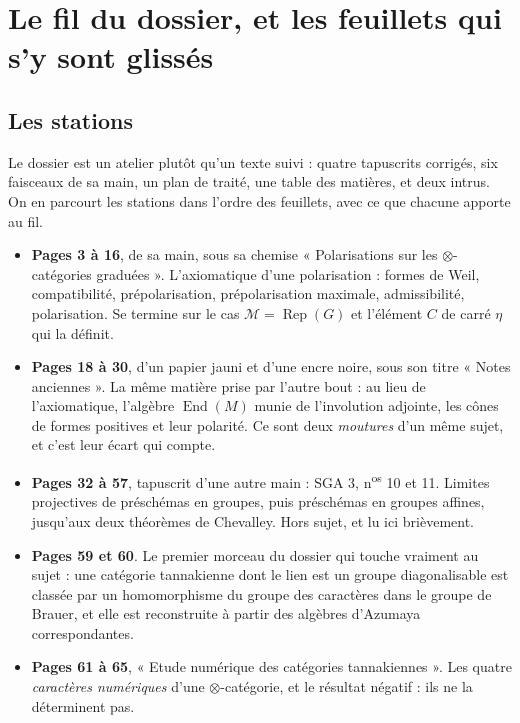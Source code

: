 \documentclass[11pt,a4paper]{article}
\begin{document}
\section*{Le fil du dossier, et les feuillets qui s'y sont glissés}

\subsection*{Les stations}

Le dossier est un atelier plutôt qu'un texte suivi : quatre tapuscrits
corrigés, six faisceaux de sa main, un plan de traité, une table des matières,
et deux intrus. On en parcourt les stations dans l'ordre des feuillets, avec
ce que chacune apporte au fil.

\begin{itemize}
\item \textbf{Pages 3 à 16}, de sa main, sous sa chemise « Polarisations sur
les $\otimes$-catégories graduées ». L'axiomatique d'une polarisation :
formes de Weil, compatibilité, prépolarisation, prépolarisation maximale,
admissibilité, polarisation. Se termine sur le cas $\mathcal{M} =
\operatorname{Rep}(G)$ et l'élément $C$ de carré $\eta$ qui la définit.

\item \textbf{Pages 18 à 30}, d'un papier jauni et d'une encre noire, sous son
titre « Notes anciennes ». La même matière prise par l'autre bout : au lieu de
l'axiomatique, l'algèbre $\operatorname{End}(M)$ munie de l'involution
adjointe, les cônes de formes positives et leur polarité. Ce sont deux
\emph{moutures} d'un même sujet, et c'est leur écart qui compte.

\item \textbf{Pages 32 à 57}, tapuscrit d'une autre main : SGA 3,
n\textsuperscript{os} 10 et 11. Limites projectives de préschémas en groupes,
puis préschémas en groupes affines, jusqu'aux deux théorèmes de Chevalley. Hors
sujet, et lu ici brièvement.

\item \textbf{Pages 59 et 60}. Le premier morceau du dossier qui touche
vraiment au sujet : une catégorie tannakienne dont le lien est un groupe
diagonalisable est classée par un homomorphisme du groupe des caractères dans
le groupe de Brauer, et elle est reconstruite à partir des algèbres d'Azumaya
correspondantes.

\item \textbf{Pages 61 à 65}, « Etude numérique des catégories tannakiennes ».
Les quatre \emph{caractères numériques} d'une $\otimes$-catégorie, et le
résultat négatif : ils ne la déterminent pas.


\end{itemize}
\end{document}
